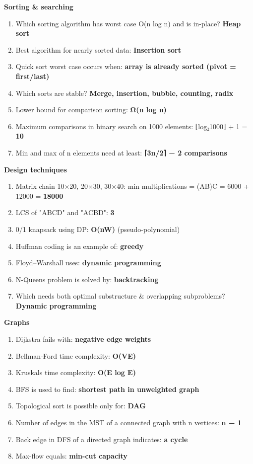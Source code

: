 \textbf{Sorting \& searching}

\begin{enumerate}
\def\labelenumi{\arabic{enumi}.}
\setcounter{enumi}{25}
\tightlist
\item
  Which sorting algorithm has worst case O(n log n) and is in-place? \textbf{Heap sort}
\item
  Best algorithm for nearly sorted data: \textbf{Insertion sort}
\item
  Quick sort worst case occurs when: \textbf{array is already sorted (pivot = first/last)}
\item
  Which sorts are stable? \textbf{Merge, insertion, bubble, counting, radix}
\item
  Lower bound for comparison sorting: \textbf{Ω(n log n)}
\item
  Maximum comparisons in binary search on 1000 elements: ⌊log₂1000⌋ + 1 = \textbf{10}
\item
  Min and max of n elements need at least: \textbf{⌈3n/2⌉ − 2 comparisons}
\end{enumerate}

\textbf{Design techniques}

\begin{enumerate}
\def\labelenumi{\arabic{enumi}.}
\setcounter{enumi}{32}
\tightlist
\item
  Matrix chain 10×20, 20×30, 30×40: min multiplications = (AB)C = 6000 + 12000 = \textbf{18000}
\item
  LCS of "ABCD" and "ACBD": \textbf{3}
\item
  0/1 knapsack using DP: \textbf{O(nW)} (pseudo-polynomial)
\item
  Huffman coding is an example of: \textbf{greedy}
\item
  Floyd--Warshall uses: \textbf{dynamic programming}
\item
  N-Queens problem is solved by: \textbf{backtracking}
\item
  Which needs both optimal substructure \& overlapping subproblems? \textbf{Dynamic programming}
\end{enumerate}

\textbf{Graphs}

\begin{enumerate}
\def\labelenumi{\arabic{enumi}.}
\setcounter{enumi}{39}
\tightlist
\item
  Dijkstra fails with: \textbf{negative edge weights}
\item
  Bellman-Ford time complexity: \textbf{O(VE)}
\item
  Kruskal\textquotesingle s time complexity: \textbf{O(E log E)}
\item
  BFS is used to find: \textbf{shortest path in unweighted graph}
\item
  Topological sort is possible only for: \textbf{DAG}
\item
  Number of edges in the MST of a connected graph with n vertices: \textbf{n − 1}
\item
  Back edge in DFS of a directed graph indicates: \textbf{a cycle}
\item
  Max-flow equals: \textbf{min-cut capacity}
\end{enumerate}

